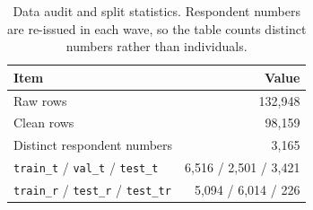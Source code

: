 \begin{table}[t]
\centering
\small
\begin{tabular}{lr}
\toprule
Item & Value \\
\midrule
Raw rows & 132,948 \\
Clean rows & 98,159 \\
Distinct respondent numbers & 3,165 \\
\texttt{train\_t} / \texttt{val\_t} / \texttt{test\_t} & 6,516 / 2,501 / 3,421 \\
\texttt{train\_r} / \texttt{test\_r} / \texttt{test\_tr} & 5,094 / 6,014 / 226 \\
\bottomrule
\end{tabular}
\caption{Data audit and split statistics. Respondent numbers are re-issued in
each wave, so the table counts distinct numbers rather than individuals.}
\label{tab:data}
\end{table}
